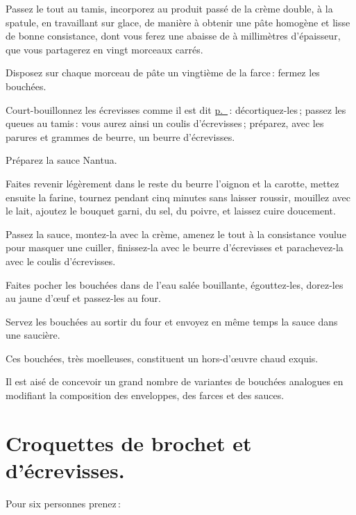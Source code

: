 Passez le tout au tamis, incorporez au produit passé de la crème double, à la
spatule, en travaillant sur glace, de manière à obtenir une pâte homogène et
lisse de bonne consistance, dont vous ferez une abaisse de {\mmm}
à {\mmm} millimètres d'épaisseur, que vous partagerez en vingt morceaux
carrés.

Disposez sur chaque morceau de pâte un vingtième de la farce : fermez les
bouchées.

Court-bouillonnez les écrevisses comme il est dit
\hyperlink{p0287}{p. \pageref{pg0287}} : décortiquez-les ; passez les queues au
tamis : vous aurez ainsi un coulis d'écrevisses ; préparez, avec les parures et
{\mmm} grammes de beurre, un beurre d'écrevisses.

Préparez la sauce Nantua.

Faites revenir légèrement dans le reste du beurre l'oignon et la carotte, mettez
ensuite la farine, tournez pendant cinq minutes sans laisser roussir, mouillez avec
le lait, ajoutez le bouquet garni, du sel, du poivre, et laissez cuire doucement.

Passez la sauce, montez-la avec la crème, amenez le tout à la consistance voulue
pour masquer une cuiller, finissez-la avec le beurre d'écrevisses et parachevez-la
avec le coulis d'écrevisses.

Faites pocher les bouchées dans de l'eau salée bouillante, égouttez-les, dorez-les
au jaune d'œuf et passez-les au four.

Servez les bouchées au sortir du four et envoyez en même temps la sauce dans
une saucière.

Ces bouchées, très moelleuses, constituent un hors-d'œuvre chaud exquis.

\sk

Il est aisé de concevoir un grand nombre de variantes de bouchées analogues en
modifiant la composition des enveloppes, des farces et des sauces.

\section*{\centering Croquettes de brochet et d'écrevisses.}

Pour six personnes prenez :

\medskip

